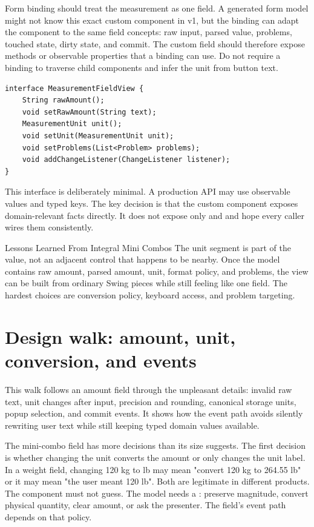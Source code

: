 Form binding should treat the measurement as one field. A generated form model might not
know this exact custom component in v1, but the binding can adapt the component to the
same field concepts: raw input, parsed value, problems, touched state, dirty state, and
commit. The custom field should therefore expose methods or observable properties that a
binding can use. Do not require a binding to traverse child components and infer the
unit from button text.

\begin{lstlisting}[caption={A binding surface exposes measurement facts directly.}]
interface MeasurementFieldView {
    String rawAmount();
    void setRawAmount(String text);
    MeasurementUnit unit();
    void setUnit(MeasurementUnit unit);
    void setProblems(List<Problem> problems);
    void addChangeListener(ChangeListener listener);
}
\end{lstlisting}

This interface is deliberately minimal. A production API may use observable values and
typed keys. The key decision is that the custom component exposes domain-relevant facts
directly. It does not expose only  and
 and hope every caller wires them consistently.

\begin{principlebox}{Lessons Learned From Integral Mini Combos}
The unit segment is part of the value, not an adjacent control that happens to
be nearby. Once the model contains raw amount, parsed amount, unit, format
policy, and problems, the view can be built from ordinary Swing pieces while
still feeling like one field. The hardest choices are conversion policy,
keyboard access, and problem targeting.
\end{principlebox}

\section{Design walk: amount, unit, conversion, and events}

\begin{roadmapbox}
This walk follows an amount field through the unpleasant details: invalid raw
text, unit changes after input, precision and rounding, canonical storage units,
popup selection, and commit events. It shows how the event path avoids silently
rewriting user text while still keeping typed domain values available.
\end{roadmapbox}

The mini-combo field has more decisions than its size suggests. The first decision is
whether changing the unit converts the amount or only changes the unit label. In a
weight field, changing 120 kg to lb may mean "convert 120 kg to 264.55 lb" or it may
mean "the user meant 120 lb". Both are legitimate in different products. The component
must not guess. The model needs a
: preserve magnitude, convert physical quantity, clear
amount, or ask the presenter. The field's event path depends on that policy.

